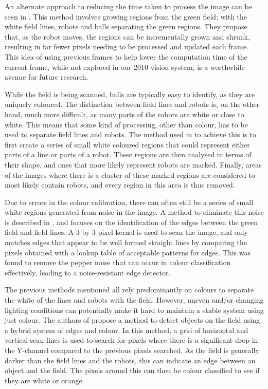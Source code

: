 \documentclass[pdftex,11pt,a4paper]{report}
\begin{document}
An alternate approach to reducing the time taken to process the image can be seen in \cite{von2004tracking}. This method involves growing regions from the green field; with the white field lines, robots and balls separating the green regions. They propose that, as the robot moves, the regions can be incrementally grown and shrunk, resulting in far fewer pixels needing to be processed and updated each frame. This idea of using previous frames to help lower the computation time of the current frame, while not explored in our 2010 vision system, is a worthwhile avenue for future research.

While the field is being scanned, balls are typically easy to identify, as they are uniquely coloured. The distinction between field lines and robots is, on the other hand, much more difficult, as many parts of the robots are white or close to white. This means that some kind of processing, other than colour, has to be used to separate field lines and robots. The method used in \cite{thomas09code} to achieve this is to first create a series of small white coloured regions that could represent either parts of a line or parts of a robot. These regions are then analysed in terms of their shape, and ones that more likely represent robots are marked. Finally, areas of the images where there is a cluster of these marked regions are considered to most likely contain robots, and every region in this area is thus removed. 

Due to errors in the colour calibration, there can often still be a series
of small white regions generated from noise in the image. A method to
eliminate this noise is described in \cite{sheh-fast}, and focuses on the
identification of the edges between the green field and field lines. A 3 by
3 pixel kernel is used to scan the image, and only matches edges that
appear to be well formed straight lines by comparing the pixels obtained
with a lookup table of acceptable patterns for edges. This was found
to remove the pepper noise that can occur in colour classification effectively,
leading to a noise-resistant edge detector.

The previous methods mentioned all rely predominantly on colours to separate the white of the lines and robots with the field. However, uneven and/or changing lighting conditions can potentially make it hard to maintain a stable system using just colour. The authors of \cite{rofer2004fast} propose a method to detect objects on the field using a hybrid system of edges and colour. In this method, a grid of horizontal and vertical scan lines is used to search for pixels where there is a significant drop in the Y-channel compared to the previous pixels searched. As the field is generally darker than the field lines and the robots, this can indicate an edge between an object and the field. The pixels around this can then be colour classified to see if they are white or orange.
\end{document}
